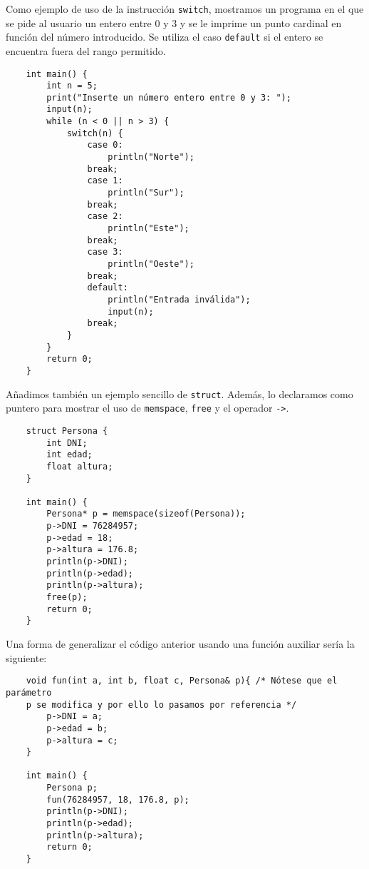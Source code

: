 \documentclass[10pt a4paper]{article}
\newcommand{\code}[1]{\colorbox{light-gray}{\texttt{#1}}}
\numberwithin{equation}{section}
\begin{document}
Como ejemplo de uso de la instrucción \code{switch}, mostramos un programa en el que se pide al usuario un entero entre 0 y 3 y se le imprime un punto cardinal en función del número introducido. Se utiliza el caso \code{default} si el entero se encuentra fuera del rango permitido.

\begin{verbatim}
    int main() {
        int n = 5;
        print("Inserte un número entero entre 0 y 3: ");
        input(n);
        while (n < 0 || n > 3) {
            switch(n) {
                case 0:
                    println("Norte");
                break;
                case 1:
                    println("Sur");
                break;
                case 2:
                    println("Este");
                break;
                case 3:
                    println("Oeste");
                break;
                default:
                    println("Entrada inválida");
                    input(n);
                break;
            }
        }
        return 0;
    }
\end{verbatim}

Añadimos también un ejemplo sencillo de \code{struct}. Además, lo declaramos como puntero para mostrar el uso de \code{memspace}, \code{free} y el operador \code{->}.

\begin{verbatim}
    struct Persona {
        int DNI;
        int edad;
        float altura;
    }
    
    int main() {
        Persona* p = memspace(sizeof(Persona));
        p->DNI = 76284957;
        p->edad = 18;
        p->altura = 176.8;
        println(p->DNI);
        println(p->edad);
        println(p->altura);
        free(p);
        return 0;
    }
\end{verbatim}

Una forma de generalizar el código anterior usando una función auxiliar sería la siguiente:

\begin{verbatim}
    void fun(int a, int b, float c, Persona& p){ /* Nótese que el parámetro
    p se modifica y por ello lo pasamos por referencia */
        p->DNI = a;
        p->edad = b;
        p->altura = c;
    }

    int main() {
        Persona p;
        fun(76284957, 18, 176.8, p);
        println(p->DNI);
        println(p->edad);
        println(p->altura);
        return 0;
    }
\end{verbatim}
\end{document}

